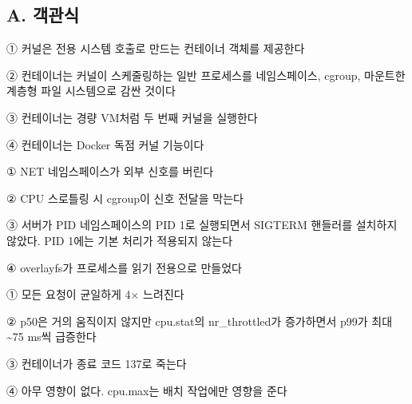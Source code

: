 
\subsection*{A. 객관식}


\begin{tbboptions}
  \item ① 커널은 전용 시스템 호출로 만드는 컨테이너 객체를 제공한다
  \item ② 컨테이너는 커널이 스케줄링하는 일반 프로세스를 네임스페이스, cgroup, 마운트한 계층형 파일 시스템으로 감싼 것이다
  \item ③ 컨테이너는 경량 VM처럼 두 번째 커널을 실행한다
  \item ④ 컨테이너는 Docker 독점 커널 기능이다
\end{tbboptions}


\begin{tbboptions}
  \item ① NET 네임스페이스가 외부 신호를 버린다
  \item ② CPU 스로틀링 시 cgroup이 신호 전달을 막는다
  \item ③ 서버가 PID 네임스페이스의 PID 1로 실행되면서 SIGTERM 핸들러를 설치하지 않았다. PID 1에는 기본 처리가 적용되지 않는다
  \item ④ overlayfs가 프로세스를 읽기 전용으로 만들었다
\end{tbboptions}


\begin{tbboptions}
  \item ① 모든 요청이 균일하게 4× 느려진다
  \item ② p50은 거의 움직이지 않지만 cpu.stat의 nr\_throttled가 증가하면서 p99가 최대 \textasciitilde{}75 ms씩 급증한다
  \item ③ 컨테이너가 종료 코드 137로 죽는다
  \item ④ 아무 영향이 없다. cpu.max는 배치 작업에만 영향을 준다
\end{tbboptions}


